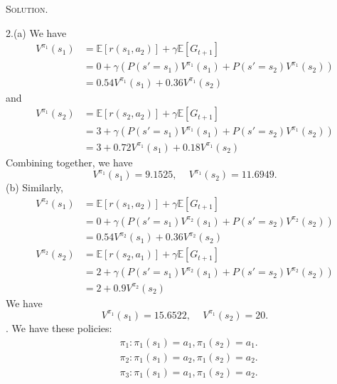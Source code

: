 \documentclass[12pt, a4paper, oneside]{ctexart}
\newenvironment{solution}{\par\noindent\textsc{Solution. }}{\\\par}
\begin{document}
\begin{solution}
\begin{center}
	\end{center}
	2.(a) We have
	\begin{align*}
	V^{\pi_1}(s_1) & = \mathbb{E}[r(s_1, a_2)] + \gamma\mathbb{E}[G_{t+1}] \\
	& = 0 + \gamma(P(s'=s_1)V^{\pi_1}(s_1) + P(s'=s_2)V^{\pi_1}(s_2)) \\
	& = 0.54 V^{\pi_1}(s_1) + 0.36 V^{\pi_1}(s_2)
	\end{align*}
	and
	\begin{align*}
	V^{\pi_1}(s_2) & = \mathbb{E}[r(s_2, a_2)] + \gamma\mathbb{E}[G_{t+1}] \\
		& = 3 + \gamma(P(s'=s_1)V^{\pi_1}(s_1) + P(s'=s_2)V^{\pi_1}(s_2)) \\
		& = 3 + 0.72 V^{\pi_1}(s_1) + 0.18 V^{\pi_1}(s_2)
	\end{align*}
	Combining together, we have
	\[
	V^{\pi_1}(s_1) = 9.1525,\, \quad V^{\pi_1}(s_2) = 11.6949.
	\]
	\newline
	(b) Similarly,
	\begin{align*}
	V^{\pi_2}(s_1) & = \mathbb{E}[r(s_1, a_2)] + \gamma\mathbb{E}[G_{t+1}] \\
	& = 0 + \gamma(P(s'=s_1)V^{\pi_2}(s_1) + P(s'=s_2)V^{\pi_2}(s_2)) \\
	& = 0.54 V^{\pi_2}(s_1) + 0.36 V^{\pi_2}(s_2)
	\end{align*}
	\begin{align*}
	V^{\pi_2}(s_2) & = \mathbb{E}[r(s_2, a_1)] + \gamma\mathbb{E}[G_{t+1}] \\
		& = 2 + \gamma(P(s'=s_1)V^{\pi_2}(s_1) + P(s'=s_2)V^{\pi_2}(s_2)) \\
		& = 2 + 0.9 V^{\pi_2}(s_2)
	\end{align*}
	We have
	\[
	V^{\pi_1}(s_1) = 15.6522,\, \quad V^{\pi_1}(s_2) = 20.
	\]
	. We have these policies:
	\begin{align*}
	& \pi_1: \pi_1(s_1) = a_1, \pi_1(s_2) = a_1. \\
	& \pi_2: \pi_1(s_1) = a_2, \pi_1(s_2) = a_2. \\
	& \pi_3: \pi_1(s_1) = a_1, \pi_1(s_2) = a_2. \\

\end{align*}
\end{solution}
\end{document}
